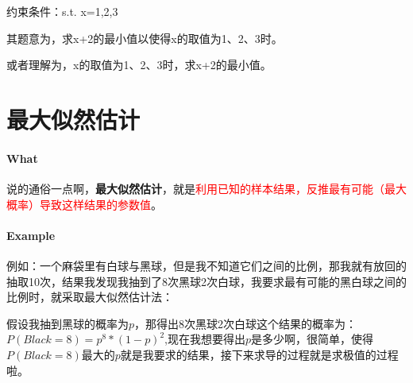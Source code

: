 \documentclass[UTF8]{ctexbook}
\begin{document}
                约束条件：s.t.  x={1,2,3}

其题意为，求x+2的最小值以使得x的取值为1、2、3时。

或者理解为，x的取值为1、2、3时，求x+2的最小值。

\section{最大似然估计}

\paragraph{What}
说的通俗一点啊，\textbf{最大似然估计}，就是\textcolor{red}{利用已知的样本结果，反推最有可能（最大概率）导致这样结果的参数值}。

\paragraph{Example}
例如：一个麻袋里有白球与黑球，但是我不知道它们之间的比例，那我就有放回的抽取10次，结果我发现我抽到了8次黑球2次白球，我要求最有可能的黑白球之间的比例时，就采取最大似然估计法：

假设我抽到黑球的概率为$p$，那得出8次黑球2次白球这个结果的概率为：
$P(Black=8)=p^{8}*(1-p)^{2}$,现在我想要得出$p$是多少啊，很简单，使得$P(Black=8)$最大的$p$就是我要求的结果，接下来求导的过程就是求极值的过程啦。

\end{document}
